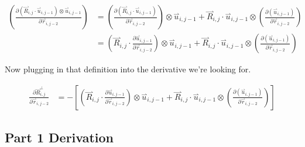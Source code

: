 \documentclass{article}
\renewcommand{\ij}{_{i,j}}
\newcommand{\ijj}{_{i,j-1}}
\newcommand{\ijk}{_{i,j-2}}
\newcommand{\ijjj}{_{i,j-2}}
\renewcommand{\part}[2]{\frac{\partial #1 }{\partial #2}}
\newcommand{\harp}{\overset{\rightharpoonup}}
\newcommand{\Rij}{\harp R \ij}
\newcommand{\rijjj}{\harp r \ijjj}
\newcommand{\uijj}{\harp u \ijj}
\begin{document}
\begin{align*}
  \left(  
  \part{
  \left(\harp R\ij \cdot \harp u \ijj \right)\otimes \uijj}{\harp r\ijk}  
  \right)
  &= 
  \left(  
  \part{
  \left(\harp R\ij \cdot \harp u \ijj \right)}{\harp r\ijk}  
  \right)\otimes \uijj 
  + 
  \harp R\ij \cdot \harp u \ijj
  \otimes
  \left(  
  \part{
  ( \uijj  )}{\harp r\ijk}  
  \right)
  \\
  &= 
  \left(  
  \Rij \cdot  \part{\uijj}{\rijjj} 
  \right)
  \otimes \uijj 
  + 
  \harp R\ij \cdot \harp u \ijj
  \otimes
  \left(  
  \part{
  ( \uijj  )}{\harp r\ijk}  
  \right)
\end{align*}



Now plugging in that definition into the derivative we're looking for.

\begin{align*}
  \part{\harp R\ij ^ \bot}{\harp r\ijk}  &=  
  -\left[
  \left(  
  \Rij \cdot  \part{\uijj}{\rijjj} 
  \right)
  \otimes \uijj 
  + 
  \harp R\ij \cdot \harp u \ijj
  \otimes
  \left(  
  \part{
  ( \uijj  )}{\harp r\ijk}  
  \right)
  \right]
\end{align*}

\subsection{Part 1 Derivation}
\end{document}
